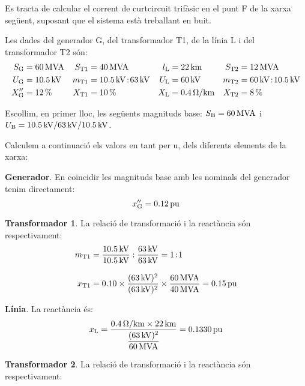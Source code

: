 \begin{exemple}[\MetodeCalculPU{}]\label{ex:MetodeCalculPU}
	\addcontentsxms{\MetodeCalculPU}
    Es tracta de calcular el corrent de curtcircuit trifàsic en el punt F de la xarxa següent, suposant
    que el sistema està treballant en buit.
    \begin{center}
        
    \end{center}

    Les dades del generador G, del transformador T1, de la línia L i del transformador T2 són:
    \begin{align*}
       S_\mathrm{G} &= \qty{60}{MVA} & S_\mathrm{T1} &= \qty{40}{MVA} & l_\mathrm{L} &= \qty{22}{km} & S_\mathrm{T2} &=
       \qty{12}{MVA} \\
       U_\mathrm{G} &= \qty{10,5}{kV} & m_\mathrm{T1} &= \qty{10,5}{kV}\!:\!\qty{63}{kV} & U_\mathrm{L} &= \qty{60}{kV} & m_\mathrm{T2} &= \qty{60}{kV}\!:\!\qty{10,5}{kV} \\
       X''_\mathrm{G} &= \qty{12}{\percent} & X_\mathrm{T1} &= \qty{10}{\percent} & X_\mathrm{L} &= \qty{0,4}{\ohm/km} & X_\mathrm{T2} &= \qty{8}{\percent}
    \end{align*}

    Escollim, en primer lloc, les següents magnituds base: $S_\mathrm{B} = \qty{60}{MVA}$ i $U_\mathrm{B}
    = \qty{10,5}{kV} / \qty{63}{kV} / \qty{10,5}{kV}$.

    Calculem a continuació els valors en tant per u, dels diferents elements de la xarxa:

    \textbf{Generador}. En coincidir les magnituds base amb les nominals del generador tenim
     directament:
    \[
    x''_\mathrm{G} = \qty{0,12}{pu}
    \]

    \textbf{Transformador 1}. La relació de transformació i la reactància són respectivament:
    \begin{align*}
    m_\mathrm{T1} &= \frac{\qty{10,5}{kV}}{\qty{10,5}{kV}} :
    \frac{\qty{63}{kV}}{\qty{63}{kV}} = 1\!:\!1 \\[3mm]
    x_\mathrm{T1} &= \num{0,10} \times \frac{(\qty{63}{kV})^2}{(\qty{63}{kV})^2} \times
    \frac{\qty{60}{MVA}}{\qty{40}{MVA}}  = \qty{0,15}{pu}
    \end{align*}

    \textbf{Línia}. La reactància és:
    \[
    x_\mathrm{L} = \frac{\qty{0,4}{\ohm/km} \times \qty{22}{km}} {\dfrac{(\qty{63}{kV})^2}{\qty{60}{MVA}}}  =
    \qty{0,1330}{pu}
    \]

    \textbf{Transformador 2}. La relació de transformació i la reactància són respectivament:


\end{exemple}
